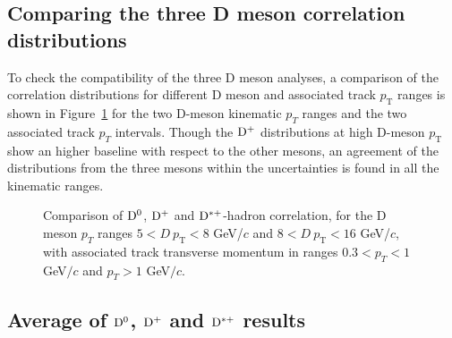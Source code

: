 \subsection{Comparing the three D meson correlation distributions}
To check the compatibility of the three D meson analyses, a comparison of the correlation distributions for different D meson and associated track $p_\mathrm{T}$ ranges is shown in Figure~\ref{fig:Data_CompareDZeroDStarDPlus} for the two D-meson kinematic $p_{T}$ ranges and the two associated track $p_{T}$ intervals. Though the ${\rm D^+}$ distributions at high D-meson $p_\mathrm{T}$ show an higher baseline with respect to the other mesons, an agreement of the distributions from the three mesons within the uncertainties is found in all the kinematic ranges.


\begin{figure}
\centering
\caption{Comparison of ${\rm D^0}$, ${\rm D^+}$ and ${\rm D^{*+}}$-hadron correlation, for the D meson $p_{T}$ ranges $5 < D\ p_\text{T} < 8$ GeV/$c$ and $8 < D\ p_\text{T} < 16$ GeV/$c$, with associated track transverse momentum in ranges $0.3 < p_{T} < 1$ GeV$/c$ and $p_{T} > 1$ GeV$/c$.}
\label{fig:Data_CompareDZeroDStarDPlus}
\end{figure}


\subsection{Average of ${\rm D^0}$, ${\rm D^+}$ and ${\rm D^{*+}}$ results}


